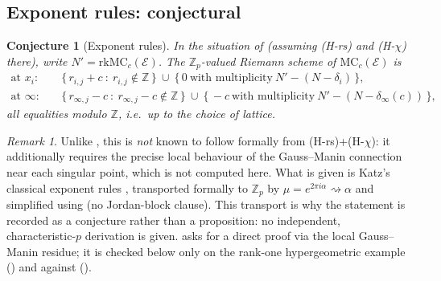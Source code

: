\documentclass[11pt,reqno]{amsart}
\newcommand{\Zp}{\mathbb{Z}_p}
\newcommand{\ZZ}{\mathbb{Z}}
\newcommand{\cE}{\mathcal{E}}
\newcommand{\rk}{\mathrm{rk}}
\newcommand{\MC}{\mathrm{MC}}
\theoremstyle{plain}
\newtheorem{conjecture}[theorem]{Conjecture}
\theoremstyle{definition}
\theoremstyle{remark}
\newtheorem{remark}[theorem]{Remark}
\numberwithin{equation}{section}
\begin{document}
\subsection{Exponent rules: conjectural}

\begin{conjecture}[Exponent rules]\label{prop:MCrules}
In the situation of  (assuming (H-rs) and (H-$\chi$)
there), write $N'=\rk\MC_c(\cE)$.  The $\Zp$-valued Riemann scheme of
$\MC_c(\cE)$ is
\[
\begin{aligned}
   \text{at }x_i:&\quad \{\,r_{i,j}+c\ :\ r_{i,j}\notin\ZZ\,\}
     \ \cup\ \{\,0\ \text{with multiplicity}\ N'-(N-\delta_i)\,\},\\[2pt]
   \text{at }\infty:&\quad \{\,r_{\infty,j}-c\ :\ r_{\infty,j}-c\notin\ZZ\,\}
     \ \cup\ \{\,-c\ \text{with multiplicity}\ N'-(N-\delta_\infty(c))\,\},
\end{aligned}
\]
all equalities modulo $\ZZ$, i.e.\ up to the choice of lattice.
\end{conjecture}

\begin{remark}
Unlike , this is \emph{not} known to follow formally
from (H-rs)+(H-$\chi$): it additionally requires the precise local
behaviour of the Gauss--Manin connection near each singular point, which
is not computed here.  What is given is Katz's classical exponent rules
\cite[Ch.~6]{Katz2}, transported formally to $\Zp$ by
$\mu=e^{2\pi i\alpha}\rightsquigarrow\alpha$ and simplified using
 (no Jordan-block clause).  This transport is why the
statement is recorded as a conjecture rather than a proposition: no
independent, characteristic-$p$ derivation is given.  
asks for a direct proof via the local Gauss--Manin residue; it is checked
below only on the rank-one hypergeometric example
() and against  ().
\end{remark}
\end{document}
